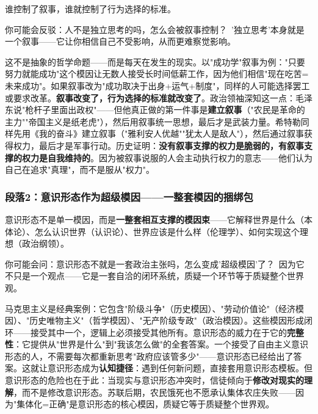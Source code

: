 \documentclass[../main.tex]{subfiles}
\begin{document}
	谁控制了叙事，谁就控制了行为选择的标准。

	\begin{tcolorbox}[colback=yellow!5, title=\textit{读者行为预测}]

		你可能会反驳：人不是独立思考的吗，怎么会被叙事控制？\ '独立思考'本身就是一个叙事——它让你相信自己不受影响，从而更难察觉影响。

	\end{tcolorbox}

这不是抽象的哲学命题——而是每天在发生的现实。以"成功学"叙事为例："只要努力就能成功"这个模因让无数人接受长时间低薪工作，因为他们相信"现在吃苦=未来成功"。如果叙事改为"成功取决于出身+运气+制度"，同样的人可能选择罢工或要求改革。\textbf{叙事改变了，行为选择的标准就改变了}。政治领袖深知这一点：毛泽东说"枪杆子里面出政权"——但他真正做的第一件事是\textbf{建立叙事}（"农民是革命的主力""帝国主义是纸老虎"），然后用叙事统一思想，最后才是武装力量。希特勒同样先用《我的奋斗》建立叙事（"雅利安人优越""犹太人是敌人"），然后通过叙事获得权力，最后才是军事行动。历史证明：\textbf{没有叙事支撑的权力是脆弱的，有叙事支撑的权力是自我维持的}。因为被叙事说服的人会主动执行权力的意志——他们认为自己在追求"真理"，而不是服从"权力"。

	\subsubsection*{段落2：意识形态作为超级模因——一整套模因的捆绑包}

	意识形态不是单一模因，而是\textbf{一整套相互支撑的模因束}——它解释世界是什么（本体论）、怎么认识世界（认识论）、世界应该是什么样（伦理学）、如何实现这个理想（政治纲领）。

	\begin{tcolorbox}[colback=yellow!5, title=\textit{读者行为预测}]

		你可能会问：意识形态不就是一套政治主张吗，怎么变成'超级模因'了？\ 因为它不只是一个观点——它是一套自洽的闭环系统，质疑一个环节等于质疑整个世界观。

	\end{tcolorbox}

马克思主义是经典案例：它包含"阶级斗争"（历史模因）、"劳动价值论"（经济模因）、"历史唯物主义"（哲学模因）、"无产阶级专政"（政治模因）。这些模因形成闭环——接受其中一个，逻辑上必须接受其他所有。意识形态的威力在于它的\textbf{完整性}：它提供从"世界是什么"到"我该怎么做"的全套答案。一个接受了自由主义意识形态的人，不需要每次都重新思考"政府应该管多少"——意识形态已经给出了答案。这就让意识形态成为\textbf{认知捷径}：遇到任何新问题，直接套用意识形态模板。但意识形态的危险也在于此：当现实与意识形态冲突时，信徒倾向于\textbf{修改对现实的理解}，而不是修改意识形态。苏联后期，农民饿死也不愿承认集体农庄失败——因为"集体化=正确"是意识形态的核心模因，质疑它等于质疑整个世界观。
\end{document}
